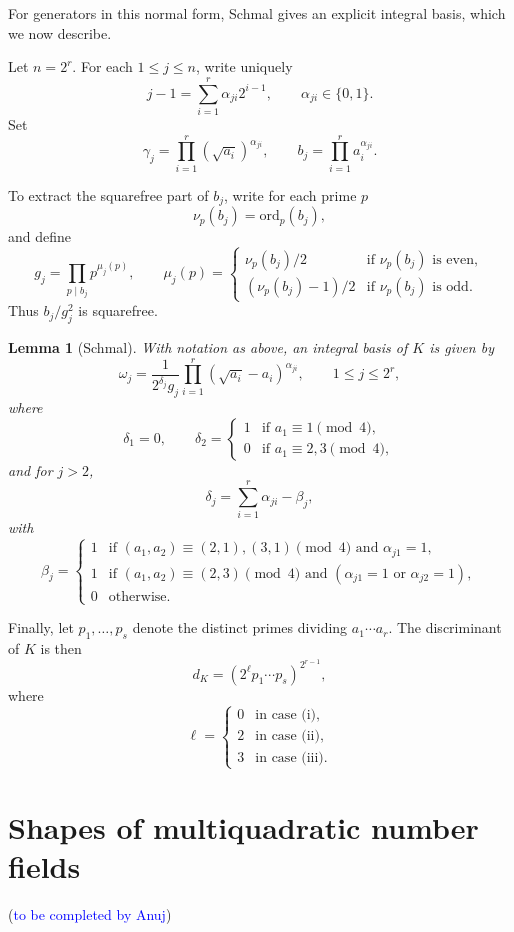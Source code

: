 \documentclass{amsart}
\newcommand{\AR}[1]{\textcolor{blue}{#1}}
\theoremstyle{plain}
\newtheorem{lemma}[theorem]{Lemma}
\theoremstyle{definition}
\theoremstyle{remark}
\numberwithin{equation}{section}
\begin{document}
For generators in this normal form, Schmal gives an explicit integral
basis, which we now describe.

Let $n=2^r$.  
For each $1\le j\le n$, write uniquely
\[
j-1=\sum_{i=1}^r \alpha_{ji}2^{i-1},
\qquad \alpha_{ji}\in\{0,1\}.
\]
Set
\[
\gamma_j=\prod_{i=1}^r (\sqrt{a_i})^{\alpha_{ji}},
\qquad 
b_j=\prod_{i=1}^r a_i^{\alpha_{ji}}.
\]

To extract the squarefree part of $b_j$, write for each prime $p$
\[
\nu_p(b_j)=\text{ord}_p(b_j),
\]
and define
\[
g_j=\prod_{p\mid b_j} p^{\mu_j(p)},
\qquad
\mu_j(p)=
\begin{cases}
\nu_p(b_j)/2 & \text{if }\nu_p(b_j)\text{ is even},\\[4pt]
(\nu_p(b_j)-1)/2 & \text{if }\nu_p(b_j)\text{ is odd}.
\end{cases}
\]
Thus $b_j/g_j^2$ is squarefree.

\begin{lemma}[Schmal]
With notation as above, an integral basis of $K$ is given by
\[
\omega_j
=
\frac{1}{2^{\delta_j}g_j}
\prod_{i=1}^r (\sqrt{a_i}-a_i)^{\alpha_{ji}},
\qquad 1\le j\le 2^r,
\]
where
\[
\delta_1=0,
\qquad
\delta_2=
\begin{cases}
1 & \text{if } a_1\equiv 1 \pmod{4},\\
0 & \text{if } a_1\equiv 2,3 \pmod{4},
\end{cases}
\]
and for $j>2$,
\[
\delta_j=\sum_{i=1}^r \alpha_{ji}-\beta_j,
\]
with
\[
\beta_j=
\begin{cases}
1 & \text{if } (a_1,a_2)\equiv(2,1),(3,1)\pmod{4}
      \text{ and }\alpha_{j1}=1,\\
1 & \text{if } (a_1,a_2)\equiv(2,3)\pmod{4}
      \text{ and }(\alpha_{j1}=1\text{ or }\alpha_{j2}=1),\\
0 & \text{otherwise}.
\end{cases}
\]
\end{lemma}

Finally, let $p_1,\ldots,p_s$ denote the distinct primes dividing
$a_1\cdots a_r$.  The discriminant of $K$ is then
\[
d_K=\left(2^{\ell} p_1\cdots p_s\right)^{2^{r-1}},
\]
where
\[
\ell=
\begin{cases}
0 & \text{in case (i)},\\
2 & \text{in case (ii)},\\
3 & \text{in case (iii)}.
\end{cases}
\]
\section{Shapes of multiquadratic number fields}
(\AR{to be completed by Anuj})
\fi
\end{document}
